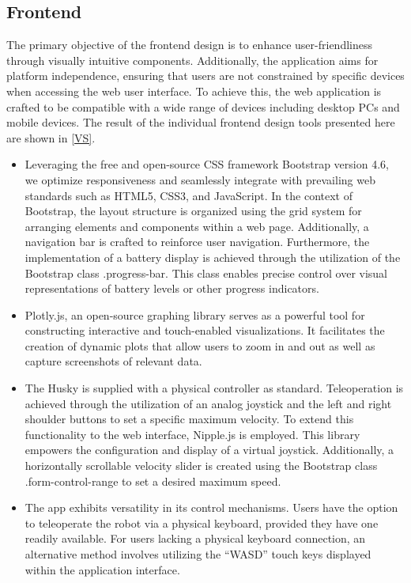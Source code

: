 \documentclass[conference]{IEEEtran}
\begin{document}
\subsection{Frontend}
The primary objective of the frontend design is to enhance user-friendliness through visually intuitive components. Additionally, the application aims for platform independence, ensuring that users are not constrained by specific devices when accessing the web user interface. 
To achieve this, the web application is crafted to be compatible with a wide range of devices including desktop PCs and mobile devices. The result of the individual frontend design tools presented here are shown in \ref{VS}.
\begin{itemize}
\item Leveraging the free and open-source CSS framework Bootstrap version 4.6, we optimize responsiveness and seamlessly integrate with prevailing web standards such as HTML5, CSS3, and JavaScript. 
In the context of Bootstrap, the layout structure is organized using the grid system for arranging elements and components within a web page. 
Additionally, a navigation bar is crafted to reinforce user navigation.
Furthermore, the implementation of a battery display is achieved through the utilization of the Bootstrap class .progress-bar. 
This class enables precise control over visual representations of battery levels or other progress indicators.
\item Plotly.js, an open-source graphing library serves as a powerful tool for constructing interactive and touch-enabled visualizations. It facilitates the creation of dynamic plots that allow users to zoom in and out as well as capture screenshots of relevant data.
\item The Husky is supplied with a physical controller as standard. Teleoperation is achieved through the utilization of an analog joystick and the left and right shoulder buttons to set a specific maximum velocity.
To extend this functionality to the web interface, Nipple.js is employed. This library empowers the configuration and display of a virtual joystick. Additionally, a horizontally scrollable velocity slider is created using the Bootstrap class .form-control-range to set a desired maximum speed.
\item The app exhibits versatility in its control mechanisms. Users have the option to teleoperate the robot via a physical keyboard, provided they have one readily available. For users lacking a physical keyboard connection, an alternative method involves utilizing the “WASD” touch keys displayed within the application interface. 

\end{itemize}
\end{document}
